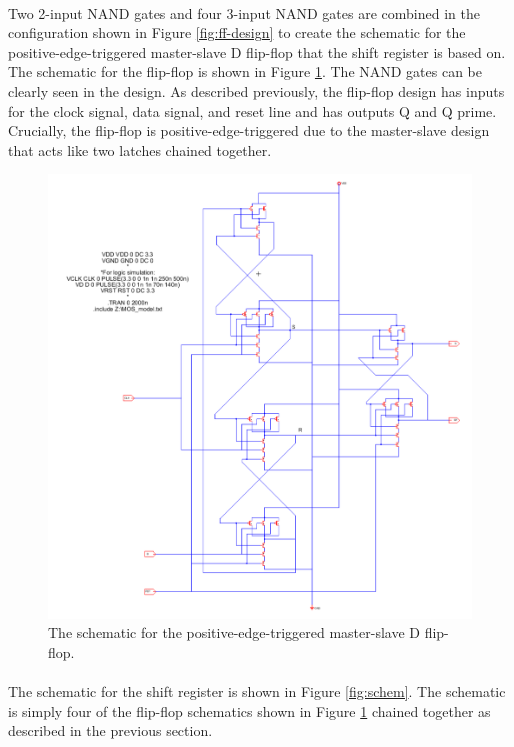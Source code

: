 \documentclass{article}
\begin{document}
  \paragraph{}
  Two 2-input NAND gates and four 3-input NAND gates are combined in the configuration shown in Figure \ref{fig:ff-design} to create the schematic for the positive-edge-triggered master-slave D flip-flop that the shift register is based on. The schematic for the flip-flop is shown in Figure \ref{fig:d-ff-schem}. The NAND gates can be clearly seen in the design. As described previously, the flip-flop design has inputs for the clock signal, data signal, and reset line and has outputs Q and Q prime. Crucially, the flip-flop is positive-edge-triggered due to the master-slave design that acts like two latches chained together.


  \begin{figure}[H]
    \centering
    \includegraphics[width=0.9\linewidth, frame]{screenshots/d-ff-schem.png}
    \caption{The schematic for the positive-edge-triggered master-slave D flip-flop.}
    \label{fig:d-ff-schem}
  \end{figure}

  \paragraph{}
  The schematic for the shift register is shown in Figure \ref{fig:schem}. The schematic is simply four of the flip-flop schematics shown in Figure \ref{fig:d-ff-schem} chained together as described in the previous section. 
\end{document}
